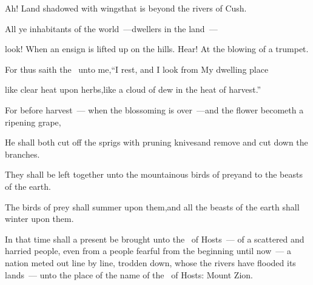 
\begin{inparaenum}
  \pa{} Ah! Land shadowed with wings\pa{}that is beyond the rivers of Cush.%

  \pa{} All ye inhabitants of the world~---\pa{}dwellers in the land~---%

  \pa{}look! When an ensign is lifted up on the hills. Hear! At the blowing of a trumpet.%

  \pa{} For thus saith the \lord\ unto me,\pa{}``I rest, and I look from My dwelling place%

  \pb{}like clear heat upon herbs,\pa{}like a cloud of dew in the heat of harvest.''%

  \pa{} For before harvest~--- when the blossoming is over~---\pa{}and the flower becometh a ripening grape,%

  \pb{}He shall both cut off the sprigs with pruning knives\pa{}and remove and cut down the branches.%

  \pa{} They shall be left together unto the mountainous birds of prey\pa{}and to the beasts of the earth.%

  \pa{}The birds of prey shall summer upon them,\pa{}and all the beasts of the earth shall winter upon them.%

  \noindent {} In that time shall a present be brought unto the \lord\ of Hosts~--- of a scattered and harried people, even from a people fearful from the beginning until now~--- a nation meted out line by line, trodden down, whose the rivers have flooded its lands~--- unto the place of the name of the \lord\ of Hosts: Mount Zion.%
\end{inparaenum}
